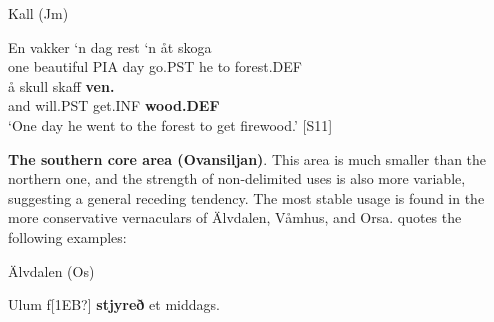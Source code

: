 
\item 

Kall (Jm)



 \ea\label{}
\gll En  vakker  ‘n  dag  rest  ‘n  åt  skoga\\


one  beautiful  PIA  day  go.PST  he  to  forest.DEF\\

 \ea\label{}
\gll å  skull  skaff  \textbf{ven.}\\


and  will.PST  get.INF  \textbf{wood.DEF}\\

\glt ‘One day he went to the forest to get firewood.’ [S11]

\z

\textbf{The southern core area (Ovansiljan)}. This area is much smaller than the northern one, and the strength of non-delimited uses is also more variable, suggesting a general receding tendency. The most stable usage is found in the more conservative vernaculars of Älvdalen, Våmhus, and Orsa. \citet[95]{Levander1909} quotes the following examples:


\item 

Älvdalen (Os)



\item 


 \ea\label{}
\gll Ulum  f[1EB?]  \textbf{stjyreð} et  middags.  \\


